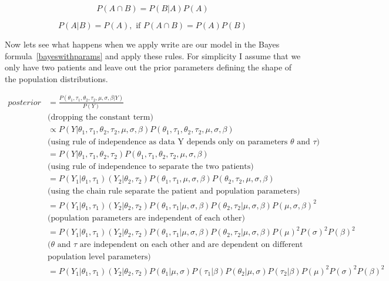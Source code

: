 \documentclass[12pt,a4paper,leqno]{report}
\theoremstyle{plain}
\theoremstyle{definition}
\theoremstyle{remark}
\begin{document}
\begin{def}\label{}
    \begin{equation}\label{chainrule}
        P(A \cap B) = P(B|A)P(A)
    \end{equation}
\end{def}

\begin{def}\label{}
    \begin{equation}\label{chainrule}
        P(A|B) = P(A), \text{ if } P(A \cap B) = P(A)P(B)
    \end{equation}
\end{def}

Now lets see what happens when we apply write are our model in the Bayes formula\
\ref{bayeswithparams} and apply these rules. For simplicity I assume that we only have
two patients and leave out the prior parameters defining the shape of the population distributions.


\begin{equation*}\label{}
    \begin{aligned}\label{conjugatebayesrule}
        posterior &= \frac{P(\theta_1,\tau_1,\theta_2,\tau_2,\mu,\sigma,\beta| Y)}{P(Y)} \\
        &\text{(dropping the constant term)} \nonumber \\
        &\propto P(Y|\theta_1,\tau_1,\theta_2,\tau_2,\mu,\sigma,\beta)P(\theta_1,\tau_1,\theta_2,\tau_2,\mu,\sigma,\beta) \nonumber \\
        &\text{(using rule of independence as data Y depends only on parameters $\theta$ and $\tau$)} \nonumber \\
        &= P(Y|\theta_1,\tau_1, \theta_2, \tau_2)P(\theta_1,\tau_1,\theta_2,\tau_2,\mu,\sigma,\beta) \nonumber \\
        &\text{(using rule of independence to separate the two patients)} \nonumber \\
        &= P(Y_1|\theta_1,\tau_1)(Y_2|\theta_2, \tau_2)P(\theta_1,\tau_1, \mu,\sigma,\beta)P(\theta_2,\tau_2,\mu,\sigma,\beta) \nonumber \\
        &\text{(using the chain rule separate the patient and population parameters)} \nonumber \\
        &= P(Y_1|\theta_1,\tau_1)(Y_2|\theta_2, \tau_2)P(\theta_1,\tau_1|\mu,\sigma,\beta)P(\theta_2,\tau_2|\mu,\sigma,\beta)P(\mu,\sigma,\beta)^2 \nonumber \\
        &\text{(population parameters are independent of each other)} \nonumber \\
        &= P(Y_1|\theta_1,\tau_1)(Y_2|\theta_2, \tau_2)P(\theta_1,\tau_1|\mu,\sigma,\beta)P(\theta_2,\tau_2|\mu,\sigma,\beta)P(\mu)^2P(\sigma)^2P(\beta)^2 \nonumber \\
        &\text{($\theta$ and $\tau$ are independent on each other and are dependent on different} \nonumber \\
        & \text{population level parameters)} \nonumber \\
        &= P(Y_1|\theta_1,\tau_1)(Y_2|\theta_2, \tau_2)P(\theta_1|\mu,\sigma)P(\tau_1|\beta)P(\theta_2|\mu,\sigma)P(\tau_2|\beta)P(\mu)^2P(\sigma)^2P(\beta)^2 \nonumber
    \end{aligned}
\end{equation*}
\end{document}
